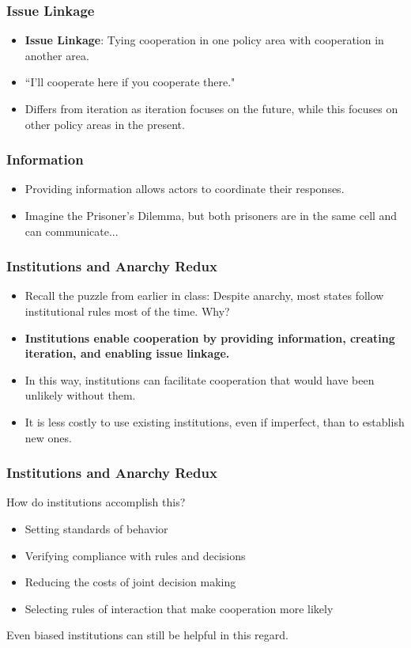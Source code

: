\documentclass{beamer}
\begin{document}
\begin{frame} 
	\frametitle{\LARGE{Issue Linkage}}
	\begin{itemize}
		\item \textbf{Issue Linkage}: Tying cooperation in one policy area with cooperation in another area.		
		\item ``I'll cooperate here if you cooperate there." \pause
		\item Differs from iteration as iteration focuses on the future, while this focuses on other policy areas in the present.
	\end{itemize}
\end{frame}

\begin{frame} 
	\frametitle{\LARGE{Information}}
	\begin{itemize}
		\item Providing information allows actors to coordinate their responses. \pause
		\item Imagine the Prisoner's Dilemma, but both prisoners are in the same cell and can communicate...
	\end{itemize}
\end{frame}

\begin{frame} 
	\frametitle{\LARGE{Institutions and Anarchy Redux}}	
	\begin{itemize}
		\item Recall the puzzle from earlier in class: Despite anarchy, most states follow institutional rules most of the time. Why? \pause
		\item \textbf{Institutions enable cooperation by providing information, creating iteration, and enabling issue linkage.} \pause
		\item In this way, institutions can facilitate cooperation that would have been unlikely without them. \pause
		\item It is less costly to use existing institutions, even if imperfect, than to establish new ones.	
	\end{itemize}
\end{frame}

\begin{frame} 
	\frametitle{\LARGE{Institutions and Anarchy Redux}}	
	How do institutions accomplish this? \pause
	\begin{itemize}
		\item Setting standards of behavior
		\item Verifying compliance with rules and decisions
		\item Reducing the costs of joint decision making
		\item Selecting rules of interaction that make cooperation more likely	
	\end{itemize}
	Even biased institutions can still be helpful in this regard.
\end{frame}
\end{document}
